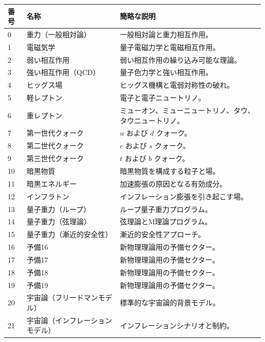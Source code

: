 \documentclass[13pt,a4paper]{ltjsarticle}
\begin{document}
	\begin{longtable}{|p{0.9cm}|p{6.0cm}|p{8.6cm}|}
		\hline
		\textbf{番号} & \textbf{名称} & \textbf{簡略な説明} \\
		\hline
		\endhead
		0 & 重力（一般相対論） & 一般相対論と重力相互作用。 \\
		\hline
		1 & 電磁気学 & 量子電磁力学と電磁相互作用。 \\
		\hline
		2 & 弱い相互作用 & 弱い相互作用の繰り込み可能な理論。 \\
		\hline
		3 & 強い相互作用（QCD） & 量子色力学と強い相互作用。 \\
		\hline
		4 & ヒッグス場 & ヒッグス機構と電弱対称性の破れ。 \\
		\hline
		5 & 軽レプトン & 電子と電子ニュートリノ。 \\
		\hline
		6 & 重レプトン & ミューオン、ミューニュートリノ、タウ、タウニュートリノ。 \\
		\hline
		7 & 第一世代クォーク & $u$ および $d$ クォーク。 \\
		\hline
		8 & 第二世代クォーク & $c$ および $s$ クォーク。 \\
		\hline
		9 & 第三世代クォーク & $t$ および $b$ クォーク。 \\
		\hline
		10 & 暗黒物質 & 暗黒物質を構成する粒子と場。 \\
		\hline
		11 & 暗黒エネルギー & 加速膨張の原因となる有効成分。 \\
		\hline
		12 & インフラトン & インフレーション膨張を引き起こす場。 \\
		\hline
		13 & 量子重力（ループ） & ループ量子重力プログラム。 \\
		\hline
		14 & 量子重力（弦理論） & 弦理論とM理論プログラム。 \\
		\hline
		15 & 量子重力（漸近的安全性） & 漸近的安全性アプローチ。 \\
		\hline
		16 & 予備16 & 新物理理論用の予備セクター。 \\
		\hline
		17 & 予備17 & 新物理理論用の予備セクター。 \\
		\hline
		18 & 予備18 & 新物理理論用の予備セクター。 \\
		\hline
		19 & 予備19 & 新物理理論用の予備セクター。 \\
		\hline
		20 & 宇宙論（フリードマンモデル） & 標準的な宇宙論的背景モデル。 \\
		\hline
		21 & 宇宙論（インフレーションモデル） & インフレーションシナリオと制約。 \\
		\hline

\end{longtable}
\end{document}
